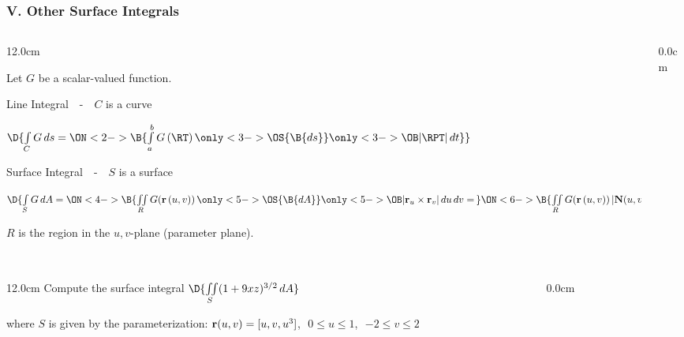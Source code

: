 \begin{frame}
\frametitle{V. Other Surface Integrals}
\scriptsize
\begin{columns}
\begin{column}{12.0cm}

Let $G$ be a scalar-valued function.

\vspace{0.7cm}

Line Integral \,\, - \,\, $C$ is a curve

\begin{center}
	$\D{\int \limits_{C} G \, ds = 
	\ON<2->{\B{\int \limits_{a}^{b} G\,(\RT)\, \only<3->{\OS{\B{ ds }}}{\only<3->{\OB}{ |\RPT| \, dt }}}}}$
\end{center}

\vspace{0.2cm}

Surface Integral \,\, - \,\, $S$ is a surface

\begin{center}
	$\D{\int \limits_{S} G \, dA = 
	\ON<4->{\B{\iint \limits_{R} G({\bf r}\,(u,v)) \, \only<5->{\OS{\B{ dA }}}{\only<5->{\OB}{ |{\bf r}_u \times {\bf r}_v| \, du \, dv }} = \,}}
	\ON<6->{\B{\iint \limits_{R} G({\bf r}\,(u,v)) \, |{\bf N}(u,v)| \, du \, dv}}}$
\end{center}

\vspace{0.5cm}

$R$ is the region in the $u,v$-plane (parameter plane).

\vspace{1.2cm}

\end{column}
\begin{column}{0.0cm}\end{column}
\end{columns}
\end{frame}

\begin{frame}
\frametitle{}
\scriptsize
\begin{columns}
\begin{column}{12.0cm}
\EX Compute the surface integral \qquad $\D{\iint \limits_{S} (1 + 9xz)^{3/2}\, dA}$

\vspace{0.1cm}

where $S$ is given by the parameterization: ${\bf r}(u,v) = [u,v,u^3]$,\,\, $0 \le u \le 1$,\,\, $-2 \le v \le 2$

\vspace{7.6cm}
	
\end{column}
\begin{column}{0.0cm}\end{column}
\end{columns}
\end{frame}

